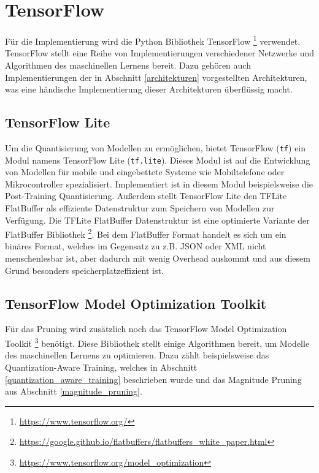 \section{TensorFlow}
Für die Implementierung wird die Python Bibliothek TensorFlow \footnote{\url{https://www.tensorflow.org/}} verwendet. TensorFlow stellt eine Reihe von Implementierungen verschiedener Netzwerke und Algorithmen des maschinellen Lernens bereit. Dazu gehören auch Implementierungen der in Abschnitt \ref{architekturen} vorgestellten Architekturen, was eine händische Implementierung dieser Architekturen überflüssig macht.


\subsection{TensorFlow Lite}
Um die Quantisierung von Modellen zu ermöglichen, bietet TensorFlow (\lstinline{tf}) ein Modul namens TensorFlow Lite (\lstinline{tf.lite}). Dieses Modul ist auf die Entwicklung von Modellen für mobile und eingebettete Systeme wie Mobiltelefone oder Mikrocontroller spezialisiert.
Implementiert ist in diesem Modul beispielsweise die Post-Training Quantisierung. Außerdem stellt TensorFlow Lite den TFLite FlatBuffer als effiziente Datenstruktur zum Speichern von Modellen zur Verfügung. Die TFLite FlatBuffer Datenstruktur ist eine optimierte Variante der FlatBuffer Bibliothek \footnote{\url{https://google.github.io/flatbuffers/flatbuffers\_white\_paper.html}}. Bei dem FlatBuffer Format handelt es sich um ein binäres Format, welches im Gegensatz zu z.B. JSON oder XML nicht menschenlesbar ist, aber dadurch mit wenig Overhead auskommt und aus diesem Grund besonders speicherplatzeffizient ist.
 

\subsection{TensorFlow Model Optimization Toolkit}
Für das Pruning wird zusätzlich noch das TensorFlow Model Optimization Toolkit \footnote{\url{https://www.tensorflow.org/model\_optimization}} benötigt. Diese Bibliothek stellt einige Algorithmen bereit, um Modelle des maschinellen Lernens zu optimieren. Dazu zählt beispielsweise das Quantization-Aware Training, welches in Abschnitt \ref{quantization_aware_training} beschrieben wurde und das Magnitude Pruning aus Abschnitt \ref{magnitude_pruning}.



